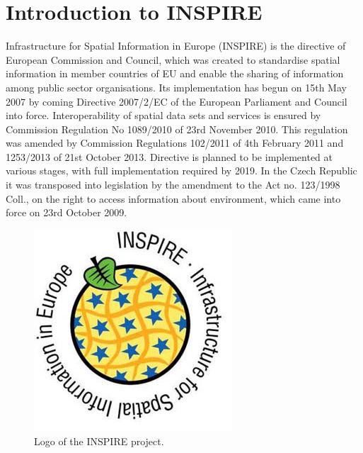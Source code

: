 \documentclass[eprint]{actapoly}
\begin{document}
\section{Introduction to INSPIRE}
Infrastructure for Spatial Information in Europe (INSPIRE) is the directive of European Commission and Council, which was created to standardise spatial information in member countries of EU and enable the sharing of information among public sector organisations. Its implementation has begun on 15th May 2007 by coming Directive 2007/2/EC of the European Parliament and Council into force. Interoperability of spatial data sets and services is ensured by Commission Regulation No 1089/2010 of 23rd November 2010. This regulation was amended by Commission Regulations 102/2011 of 4th February 2011 and 1253/2013 of 21st October 2013. Directive is planned to be implemented at various stages, with full implementation required by 2019. In the Czech Republic it was transposed into legislation by the amendment to the Act no. 123/1998 Coll., on the right to access information about environment, which came into force on 23rd October 2009. 

\begin{figure}
\centering
\includegraphics[width=0.8\linewidth]{pics/inspire_logo.png} %
\caption{Logo of the INSPIRE project.}
\label{fig:inspire_logo}
\end{figure}
\end{document}
